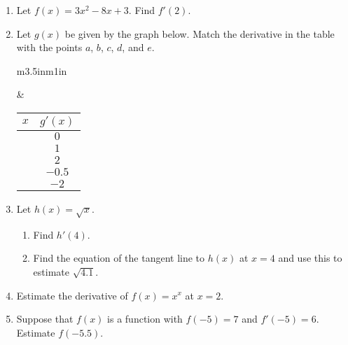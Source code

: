 \documentclass[11pt]{article}
\begin{document}
\drawtitle

\begin{enumerate}
\item Let $f(x) = 3x^2-8x+3$.  Find $f'(2)$.
  \vfill
\item Let $g(x)$ be given by the graph below.  Match the derivative
  in the table with the points $a$, $b$, $c$, $d$, and $e$.

  \begin{center}
    \begin{tabular}{m{3.5in}m{1in}}
      \begin{tikzpicture}[scale = 1.5]
        \draw[<->] (-1,0) -- (3.75,0);
        \draw[<->] (0,-2) -- (0,3);
        \draw[-] (.27,.1) -- (.27,-.1) node[below] {$a$};
        \draw[-] (.45,.1) -- (.45,-.1) node[below] {$b$};
        \draw[-] (2,.1) -- (2,-.1) node[below] {$d$};
        \draw[-] (2.5,.1) -- (2.5,-.1) node[below] {$e$};
        \draw[-] (1,.1) -- (1,-.1) node[below] {$c$};
        
        \draw[thick, domain=-.5:3.25, <->] plot[samples=200]
        function{-x*(x-1)*(x-3)} node[right]{$g(x)$};
      \end{tikzpicture}
      &
      \begin{tabular}{c|c}
        $x$ & $g'(x)$\\
        \hline
        &$0$\\
        &$1$\\
        &$2$\\
        &$-0.5$\\
        &$-2$
      \end{tabular}
    \end{tabular}
  \end{center}

  \newpage

\item Let $h(x) = \sqrt{x}$.
  \begin{enumerate}
  \item Find $h'(4)$.
    \vfill
  \item Find the equation of the tangent line to $h(x)$ at $x=4$ and
    use this to estimate $\sqrt{4.1}$.
    \vfill
  \end{enumerate}
  
  \newpage

\item Estimate the derivative of $f(x) = x^x$ at $x=2$.

  \vfill

\item Suppose that $f(x)$ is a function with $f(-5) = 7$ and $f'(-5) =
  6$.  Estimate $f(-5.5)$.
  \vfill


\end{enumerate}
\end{document}
